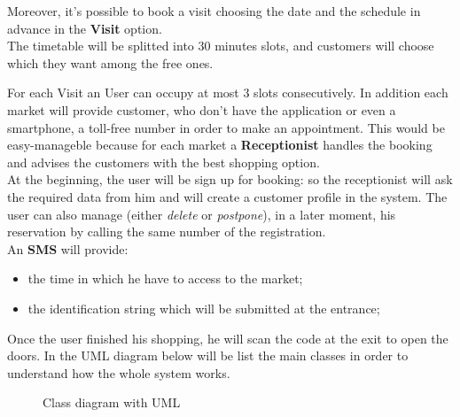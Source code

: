 \par
Moreover, it's possible to book a visit choosing the date and the schedule in advance in the \textbf{Visit} option. 
\\
The timetable will be splitted into 30 minutes slots, and customers will choose which they want among the free ones. \par
For each Visit an User can occupy at most 3 slots consecutively.
In addition each market will provide customer, who don't have the application or even a smartphone, a toll-free number in order to make an appointment.
This would be easy-manageble because for each market a \textbf{Receptionist} handles the booking and advises the customers with the best shopping option.\\
At the beginning, the user will be sign up for booking: so the receptionist will ask the required data from him and will create a customer profile in the system.
The user can also manage (either \textit{delete} or \textit{postpone}), in a later moment, his reservation by calling the same number of the registration.
\\
An \textbf{SMS} will provide:
\begin{itemize}
\item the time in which he have to access to the market;
\item the identification string which will be submitted at the entrance;
\end{itemize}

Once the user finished his shopping, he will scan the code at the exit to open the doors.
\bigskip
In the UML diagram below will be list the main classes in order to understand how the whole system works.

\par 
\bigskip
\bigskip
\begin{figure}[H]
  \label{fig:UML}
  \centering
  \caption{Class diagram with UML}
\end{figure}



